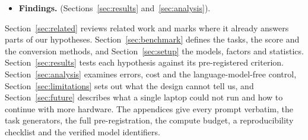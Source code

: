 \begin{itemize}
  \item \textbf{Findings.}  (Sections~\ref{sec:results} and~\ref{sec:analysis}).
\end{itemize}

Section~\ref{sec:related} reviews related work and marks where it already answers parts of our hypotheses. Section~\ref{sec:benchmark} defines the tasks, the score and the conversion methods, and Section~\ref{sec:setup} the models, factors and statistics. Section~\ref{sec:results} tests each hypothesis against its pre-registered criterion. Section~\ref{sec:analysis} examines errors, cost and the language-model-free control, Section~\ref{sec:limitations} sets out what the design cannot tell us, and Section~\ref{sec:future} describes what a single laptop could not run and how to continue with more hardware. The appendices give every prompt verbatim, the task generators, the full pre-registration, the compute budget, a reproducibility checklist and the verified model identifiers.
